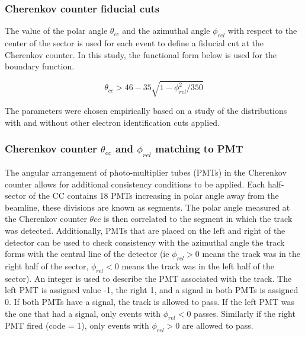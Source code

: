 \subsubsection*{Cherenkov counter fiducial cuts}
The value of the polar angle $\theta_{cc}$ and the azimuthal angle $\phi_{rel}$ with respect to the center of the sector is used for each event to define a fiducial cut at the Cherenkov counter.  In this study, the functional form below is used for the boundary function.

\begin{equation}
	\theta_{cc} > 46 - 35 \sqrt{1 - \phi_{rel}^2  / 350}
\end{equation} 

The parameters were chosen empirically based on a study of the distributions with and without other electron identification cuts applied.

\subsubsection*{Cherenkov counter $\theta_{cc}$ and $\phi_{rel}$ matching to PMT}
The angular arrangement of photo-multiplier tubes (PMTs) in the Cherenkov counter allows for additional consistency conditions to be applied.  Each half-sector of the CC contains 18 PMTs increasing in polar angle away from the beamline, these divisions are known as segments.  The polar angle measured at the Cherenkov counter $\theta{cc}$ is then correlated to the segment in which the track was detected.  Additionally, PMTs that are placed on the left and right of the detector can be used to check consistency with the azimuthal angle the track forms with the central line of the detector (ie $\phi_{rel} > 0$ means the track was in the right half of the sector, $\phi_{rel} < 0$ means the track was in the left half of the sector).  An integer is used to describe the PMT associated with the track.  The left PMT is assigned value -1, the right 1, and a signal in both PMTs is assigned 0.  If both PMTs have a signal, the track is allowed to pass.  If the left PMT was the one that had a signal, only events with $\phi_{rel} < 0$ passes.  Similarly if the right PMT fired (code = 1), only events with $\phi_{rel} > 0$ are allowed to pass. 


